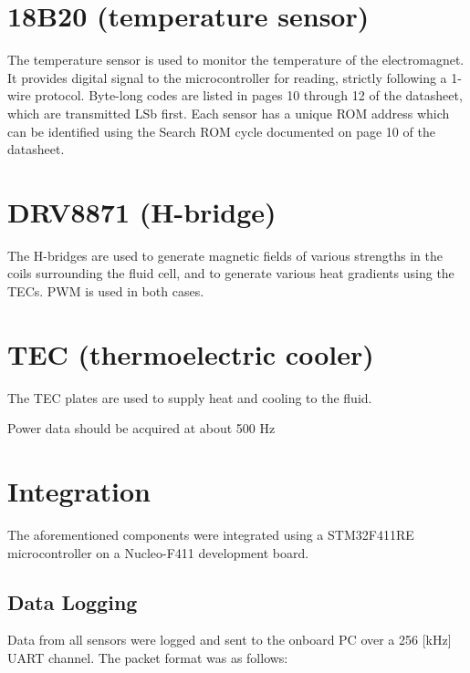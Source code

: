\documentclass{article}
\begin{document}
\clearpage

%
%
%
%

\section{18B20 (temperature sensor)} \label{tempsensor}
The temperature sensor is used to monitor the temperature of the electromagnet. It provides digital signal to the microcontroller for reading, strictly following a 1-wire protocol. Byte-long codes are listed in pages 10 through 12 of the datasheet, which are transmitted LSb first. Each sensor has a unique ROM address which can be identified using the Search ROM cycle documented on page 10 of the datasheet.
\clearpage

%
%
%
%

\section{DRV8871 (H-bridge)} \label{hbridge}
The H-bridges are used to generate magnetic fields of various strengths in the coils surrounding the fluid cell, and to generate various heat gradients using the TECs. PWM is used in both cases.
\clearpage

%
%
%
%

\section{TEC (thermoelectric cooler)} \label{18B20}
The TEC plates are used to supply heat and cooling to the fluid.

Power data should be acquired at about 500 Hz
\clearpage

%
%
%
%

\section{Integration} \label{integration}
The aforementioned components were integrated using a STM32F411RE microcontroller on a Nucleo-F411 development board.

\subsection{Data Logging}
Data from all sensors were logged and sent to the onboard PC over a 256 [kHz] UART channel. The packet format was as follows:
\end{document}
